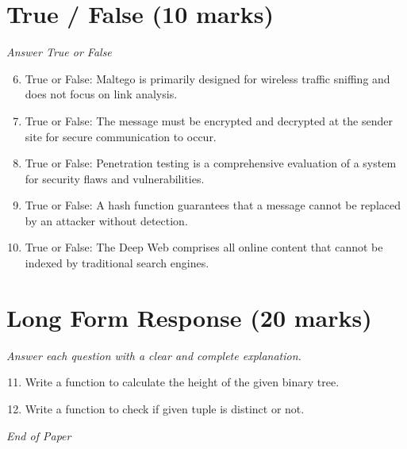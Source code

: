 \documentclass[12pt]{article}
\begin{document}
\section*{True / False (10 marks)}
\textit{Answer True or False}
\begin{enumerate}[label=\arabic*.]
\setcounter{enumi}{5}
\item True or False: Maltego is primarily designed for wireless traffic sniffing and does not focus on link analysis.
\item True or False: The message must be encrypted and decrypted at the sender site for secure communication to occur.
\item True or False: Penetration testing is a comprehensive evaluation of a system for security flaws and vulnerabilities.
\item True or False: A hash function guarantees that a message cannot be replaced by an attacker without detection.
\item True or False: The Deep Web comprises all online content that cannot be indexed by traditional search engines.
\end{enumerate}

\section*{Long Form Response (20 marks)}
\textit{Answer each question with a clear and complete explanation.}
\begin{enumerate}[label=\arabic*.]
\setcounter{enumi}{10}
\item Write a function to calculate the height of the given binary tree.
\item Write a function to check if given tuple is distinct or not.
\end{enumerate}

\vfill
\noindent\textit{End of Paper}
\end{document}
